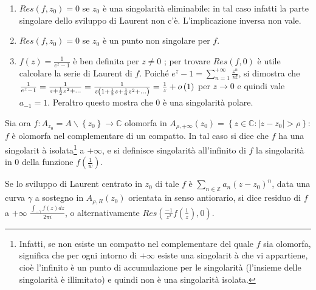 \documentclass{article}
\begin{document}
\begin{enumerate}
\item $Res\left( f,z_{0}\right) =0$ se $z_{0}$ \`{e} una singolarit\`{a}
eliminabile: in tal caso infatti la parte singolare dello sviluppo di
Laurent non c'\`{e}. L'implicazione inversa non vale.

\item $Res\left( f,z_{0}\right) =0$ se $z_{0}$ \`{e} un punto non singolare
per $f$.

\item $f\left( z\right) =\frac{1}{e^{z}-1}$ \`{e} ben definita per $z\neq 0$%
; per trovare $Res\left( f,0\right) $ \`{e} utile calcolare la serie di
Laurent di $f$. Poich\'{e} $e^{z}-1=\sum_{n=1}^{+\infty }\frac{z^{n}}{n!}$,
si dimostra che $\frac{1}{e^{z}-1}=\frac{1}{z+\frac{1}{2}z^{2}+...}=\frac{1}{%
z\left( 1+\frac{1}{2}z+\frac{1}{6}z^{2}+...\right) }=\frac{1}{z}+o\left(
1\right) $ per $z\rightarrow 0$ e quindi vale $a_{-1}=1$. Peraltro questo
mostra che $0$ \`{e} una singolarit\`{a} polare.
\end{enumerate}

Sia ora $f:A_{z_{0}}=A\backslash \left\{ z_{0}\right\} \rightarrow 
\mathbb{C}
$ olomorfa in $A_{\rho ,+\infty }\left( z_{0}\right) =\left\{ z\in 
\mathbb{C}
:\left\vert z-z_{0}\right\vert >\rho \right\} $: $f$ \`{e} olomorfa nel
complementare di un compatto. In tal caso si dice che $f$ ha una singolarit%
\`{a} isolata\footnote{%
Infatti, se non esiste un compatto nel complementare del quale $f$ sia
olomorfa, significa che per ogni intorno di $+\infty $ esiste una singolarit%
\`{a} che vi appartiene, cio\`{e} l'infinito \`{e} un punto di accumulazione
per le singolarit\`{a} (l'insieme delle singolarit\`{a} \`{e} illimitato) e
quindi non \`{e} una singolarit\`{a} isolata.} a $+\infty $, e si definisce
singolarit\`{a} all'infinito di $f$ la singolarit\`{a} in $0$ della funzione 
$f\left( \frac{1}{w}\right) $.

Se lo sviluppo di Laurent centrato in $z_{0}$ di tale $f$ \`{e} $\sum_{n\in 
\mathbb{Z}
}a_{n}\left( z-z_{0}\right) ^{n}$, data una curva $\gamma $ a sostegno in $%
A_{\rho ,R}\left( z_{0}\right) $ orientata in senso antiorario, si dice
residuo di $f$ a $+\infty $ $\frac{\int_{-\gamma }f\left( z\right) dz}{2\pi i%
}$, o alternativamente $Res\left( \frac{-1}{z^{2}}f\left( \frac{1}{z}\right)
,0\right) $.
\end{document}
